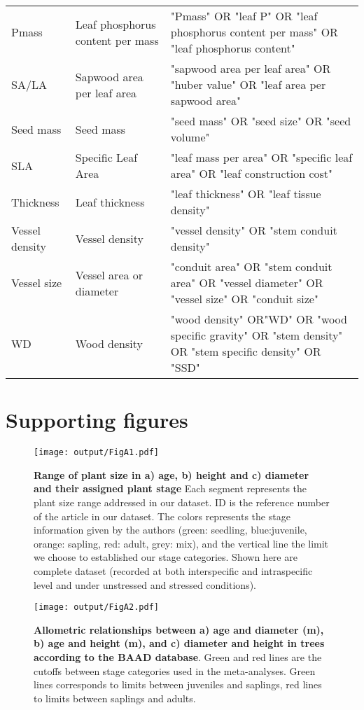 \documentclass[a4paper]{article}\usepackage[]{graphicx}\usepackage[]{color}
\begin{document}
\begin{Appendix}
\begin{Supplemnetary material}
\begin{table}[ht]
\begin{tabular}{p{3cm}p{3cm}p{8cm}}
  Pmass & Leaf phosphorus content per mass & "Pmass" OR "leaf P" OR  "leaf phosphorus content per mass" OR "leaf phosphorus content" \\
  SA/LA & Sapwood area per leaf area & "sapwood area per leaf area" OR "huber value" OR "leaf area per sapwood area" \\
  Seed mass & Seed mass & "seed mass" OR "seed size" OR "seed volume" \\
  SLA & Specific Leaf Area & "leaf mass per area" OR "specific leaf area" OR "leaf construction cost" \\
  Thickness & Leaf thickness & "leaf thickness"  OR "leaf tissue density" \\
  Vessel density & Vessel density & "vessel density" OR "stem conduit density" \\
  Vessel size & Vessel area or diameter & "conduit area" OR "stem conduit area" OR "vessel diameter" OR "vessel size" OR "conduit size"   \\
  WD & Wood density & "wood density" OR"WD" OR "wood specific gravity" OR "stem density" OR "stem specific density" OR "SSD" \\
   \hline
\end{tabular}
\end{table}

\newpage
\section{Supporting figures}\label{app:supp_info_figures}

\begin{figure}[htbp]
\centering
\texttt{[image: output/FigA1.pdf]}
\caption{\textbf{Range of plant size in \textbf{a)} age, \textbf{b)} height and \textbf{c)} diameter and their assigned plant stage} Each segment represents the plant size range addressed in our dataset. ID is the reference number of the article in our dataset. The colors represents the stage information given by the authors (green: seedling, blue:juvenile, orange: sapling, red: adult, grey: mix), and the vertical line the limit we choose to established our stage categories. Shown here are complete dataset (recorded at both interspecific and intraspecific level and under unstressed and stressed conditions). }
\label{FigA1}
\end{figure}


\begin{figure}[htbp]
\centering
\texttt{[image: output/FigA2.pdf]}
\caption{\textbf{Allometric relationships between a) age and diameter (m), b) age and height (m), and c) diameter and height in trees according to the BAAD database}. Green and red lines are the cutoffs between stage categories used in the meta-analyses. Green lines corresponds to limits between juveniles and saplings, red lines to limits between saplings and adults.}
\label{FigA2}
\end{figure}



\end{Supplemnetary material}
\end{Appendix}
\end{document}
